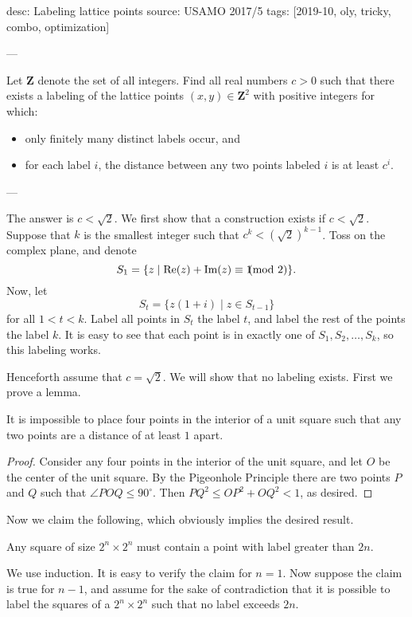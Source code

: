 desc: Labeling lattice points
source: USAMO 2017/5
tags: [2019-10, oly, tricky, combo, optimization]

---

Let $\mathbf{Z}$ denote the set of all integers. Find all real numbers $c>0$ such that there exists a labeling of the lattice points $(x,y)\in\mathbf{Z}^2$ with positive integers for which:
\begin{itemize}[itemsep=0em]
    \item only finitely many distinct labels occur, and
    \item for each label $i$, the distance between any two points labeled $i$ is at least $c^i$.
\end{itemize}

---

The answer is $c<\sqrt2$. We first show that a construction exists if $c<\sqrt2$. Suppose that $k$ is the smallest integer such that $c^k<(\sqrt2)^{k-1}$. Toss on the complex plane, and denote \[S_1=\{z\mid\text{Re}(z)+\text{Im}(z)\equiv 1\hspace{-0.75em}\pmod2\}.\]
Now, let \[S_t=\{z(1+i)\mid z\in S_{t-1}\}\]
for all $1<t<k$. Label all points in $S_t$ the label $t$, and label the rest of the points the label $k$. It is easy to see that each point is in exactly one of $S_1,S_2,\ldots,S_k$, so this labeling works.

Henceforth assume that $c=\sqrt2$. We will show that no labeling exists. First we prove a lemma.
\begin{boxlemma*}
    It is impossible to place four points in the interior of a unit square such that any two points are a distance of at least $1$ apart.
\end{boxlemma*}
\begin{proof}
    Consider any four points in the interior of the unit square, and let $O$ be the center of the unit square. By the Pigeonhole Principle there are two points $P$ and $Q$ such that $\angle POQ\le90^\circ$. Then $PQ^2\le OP^2+OQ^2<1$, as desired.
\end{proof}

Now we claim the following, which obviously implies the desired result.
\begin{iclaim*}
    Any square of size $2^n\times2^n$ must contain a point with label greater than $2n$.
\end{iclaim*}
We use induction. It is easy to verify the claim for $n=1$. Now suppose the claim is true for $n-1$, and assume for the sake of contradiction that it is possible to label the squares of a $2^n\times2^n$ such that no label exceeds $2n$.

